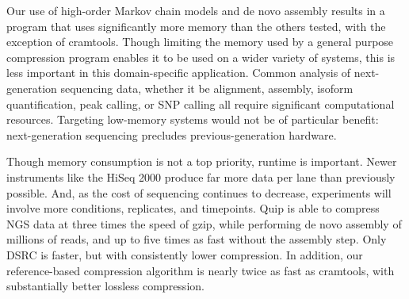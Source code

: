 \documentclass[twocolumn]{article}
\begin{document}



Our use of high-order Markov chain models and de novo assembly results in a
program that uses significantly more memory than the others tested, with the
exception of cramtools. Though limiting the memory used by a general purpose
compression program enables it to be used on a wider variety of systems, this
is less important in this domain-specific application. Common analysis of
next-generation sequencing data, whether it be alignment, assembly, isoform
quantification, peak calling, or SNP calling all require significant
computational resources. Targeting low-memory systems would not be of
particular benefit: next-generation sequencing precludes previous-generation
hardware.

Though memory consumption is not a top priority, runtime is important. Newer
instruments like the HiSeq 2000 produce far more data per lane than previously
possible. And, as the cost of sequencing continues to decrease, experiments
will involve more conditions, replicates, and timepoints.  Quip is able to
compress NGS data at three times the speed of gzip, while performing de novo
assembly of millions of reads, and up to five times as fast without the
assembly step. Only DSRC is faster, but with consistently lower compression.
In addition, our reference-based compression algorithm is nearly twice as fast
as cramtools, with substantially better lossless compression.





\end{document}
